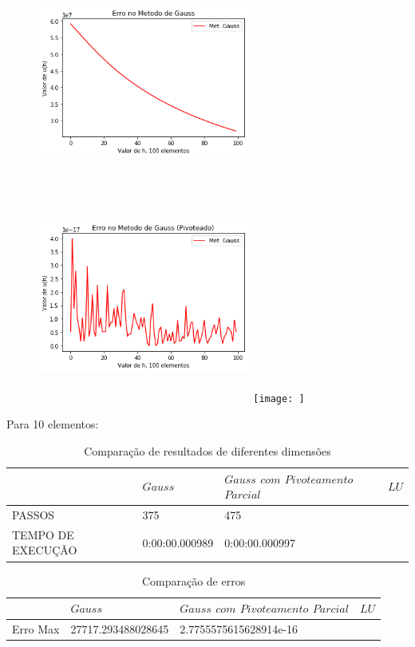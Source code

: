 \documentclass{article}
\begin{document}
\begin{figure}[!htb]
\includegraphics[width=7cm,height=7cm]{EGauss100part.png}
\includegraphics [width=7cm,height=7cm]{EGaussP100part.png}
\texttt{[image: ]}
\end{figure}

\newpage
Para 10 elementos:

\begin{table}[h]
\centering
  \begin{tabular}{l||l|l|l}
     & $ Gauss$ & $Gauss$ $com$ $Pivoteamento$ $Parcial$ & $LU$ \\
    \hline
    
    PASSOS & 375 & 475 & \\
    
    TEMPO DE EXECUÇÃO & 0:00:00.000989 & 0:00:00.000997 & \\
    
    \hline
  \end{tabular}
  \caption{Comparação de resultados de diferentes dimensões}
\end{table}

\begin{table}[h]
\centering
  \begin{tabular}{l||l|l|l}
     & $ Gauss$ & $Gauss$ $com$ $Pivoteamento$ $Parcial$ & $LU$ \\
    \hline
    
    Erro Max & 27717.293488028645 & 2.7755575615628914e-16 & \\
    
    
    \hline
  \end{tabular}
  \caption{Comparação de erros}
\end{table}
\end{document}
